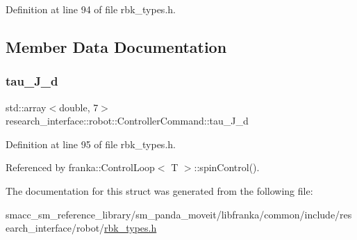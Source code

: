 Definition at line 94 of file rbk\+\_\+types.\+h.



\subsection{Member Data Documentation}
\mbox{\label{structresearch__interface_1_1robot_1_1ControllerCommand_a55f1abde5337f7ba6f170c8b7d8f89aa}} 
\subsubsection{\texorpdfstring{tau\+\_\+\+J\+\_\+d}{tau\_J\_d}}
{\footnotesize\ttfamily std\+::array$<$double, 7$>$ research\+\_\+interface\+::robot\+::\+Controller\+Command\+::tau\+\_\+\+J\+\_\+d}



Definition at line 95 of file rbk\+\_\+types.\+h.



Referenced by franka\+::\+Control\+Loop$<$ T $>$\+::spin\+Control().



The documentation for this struct was generated from the following file\+:\begin{DoxyCompactItemize}
\item 
smacc\+\_\+sm\+\_\+reference\+\_\+library/sm\+\_\+panda\+\_\+moveit/libfranka/common/include/research\+\_\+interface/robot/\hyperlink{rbk__types_8h}{rbk\+\_\+types.\+h}\end{DoxyCompactItemize}
